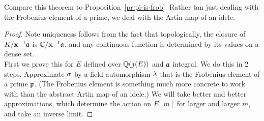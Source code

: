 Compare this theorem to Proposition~\ref{pr:pi-is-frob}. Rather tan just dealing with the Frobenius element of a prime, we deal with the Artin map of an idele.
\begin{proof}
Note uniqueness follows from the fact that topologically, the closure of $K/\mathbf{x}^{-1}\mathfrak{a}$ is $\mathbb{C}/\mathbf{x}^{-1}\mathfrak{a}$, and any continuous function is determined by its values on a dense set.\\

First we prove this for $E$ defined over $\mathbb{Q}(j(E))$ and $\mathfrak{a}$ integral. We do this in 2 steps.
 Approximate $\sigma$ by a field automorphism $\lambda$ that is the Frobenius element of a prime $\mathfrak{p}$. (The Frobenius element is something much more concrete to work with than the abstract Artin map of an idele.) We will take better and better approximations, which determine the action on $E[m]$ for larger and larger $m$, and take an inverse limit.


\end{proof}
